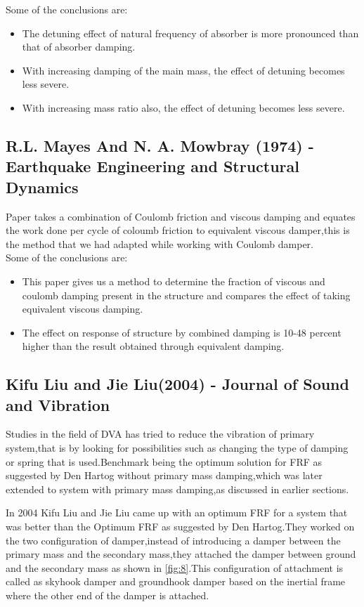 Some of the conclusions are:

\begin{itemize}
\item The detuning effect of natural frequency of absorber is more pronounced than that of absorber damping.

 \item With increasing damping of the main mass, the effect of detuning becomes less severe.

\item  With increasing mass ratio also, the effect of detuning becomes less severe.

\end{itemize}

\subsection{R.L. Mayes And N. A. Mowbray (1974) - Earthquake Engineering and Structural Dynamics}
Paper takes a combination of Coulomb friction and viscous damping and equates the work done per cycle of coloumb friction  to equivalent viscous damper,this is the method that we had adapted while working with Coulomb damper.\\

Some of the conclusions are:
\begin{itemize}
\item This paper gives us a method to determine the fraction of viscous and coulomb damping present in the structure and compares the effect of taking equivalent viscous damping.

\item The effect on response of structure by combined damping is 10-48 percent higher than the result obtained through equivalent damping.
\end{itemize}

\subsection{Kifu Liu and Jie Liu(2004) - Journal of Sound and Vibration}
Studies in the field of DVA has tried to reduce the vibration of primary system,that is by  looking for possibilities such as changing the type of damping or spring that is used.Benchmark being the optimum solution for FRF as suggested by Den Hartog without primary mass damping,which was later extended to system with primary mass damping,as discussed in earlier sections.

In 2004 Kifu Liu and Jie Liu came up with an optimum FRF for a system that was better than the Optimum FRF as suggested by Den Hartog.They worked on the two configuration of damper,instead of introducing a damper between the primary mass and the secondary mass,they attached the damper between ground and the secondary mass as shown in \ref{fig:8}.This configuration of attachment is called as skyhook damper and groundhook damper based on the inertial frame where the other end of the damper is attached.

